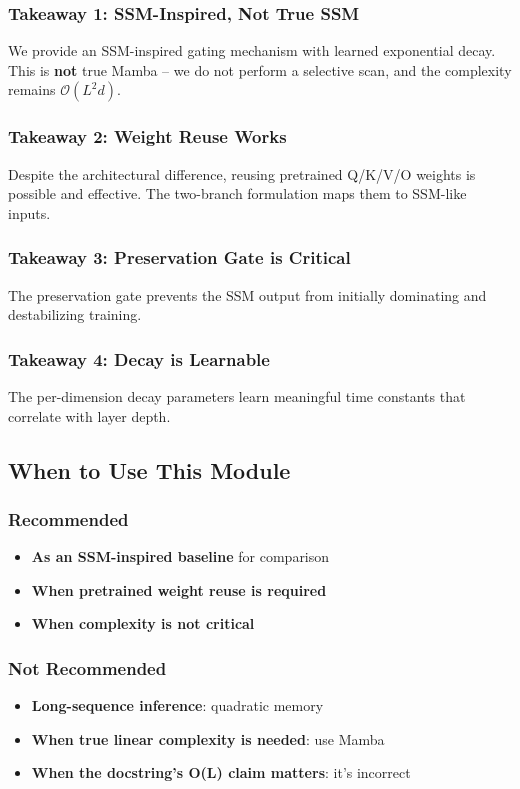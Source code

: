 \subsubsection{Takeaway 1: SSM-Inspired, Not True SSM}

We provide an SSM-inspired gating mechanism with learned exponential decay. 
This is \textbf{not} true Mamba -- we do not perform a selective scan, and the 
complexity remains $\mathcal{O}(L^2 d)$.

\subsubsection{Takeaway 2: Weight Reuse Works}

Despite the architectural difference, reusing pretrained Q/K/V/O weights is 
possible and effective. The two-branch formulation maps them to SSM-like 
inputs.

\subsubsection{Takeaway 3: Preservation Gate is Critical}

The preservation gate prevents the SSM output from initially dominating and 
destabilizing training.

\subsubsection{Takeaway 4: Decay is Learnable}

The per-dimension decay parameters learn meaningful time constants that 
correlate with layer depth.

\subsection{When to Use This Module}

\subsubsection{Recommended}
\begin{itemize}
\item \textbf{As an SSM-inspired baseline} for comparison
\item \textbf{When pretrained weight reuse is required}
\item \textbf{When complexity is not critical}

\end{itemize}
\subsubsection{Not Recommended}
\begin{itemize}
\item \textbf{Long-sequence inference}: quadratic memory
\item \textbf{When true linear complexity is needed}: use Mamba
\item \textbf{When the docstring's O(L) claim matters}: it's incorrect

\end{itemize}
